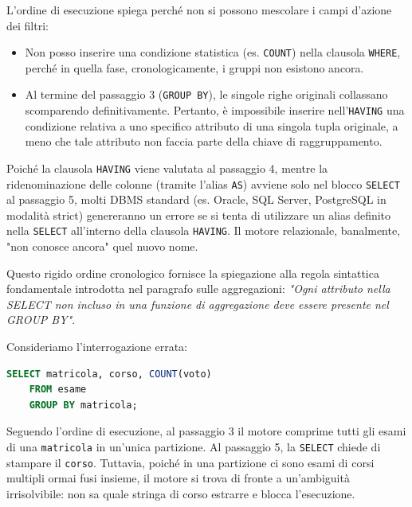 \begin{warningbox}
L'ordine di esecuzione spiega perché non si possono mescolare i campi d'azione dei filtri:
\begin{itemize}
    \item Non posso inserire una condizione statistica (es. \texttt{COUNT}) nella clausola \texttt{WHERE}, perché in quella fase, cronologicamente, i gruppi non esistono ancora.
    \item Al termine del passaggio 3 (\texttt{GROUP BY}), le singole righe originali collassano scomparendo definitivamente. Pertanto, è impossibile inserire nell'\texttt{HAVING} una condizione relativa a uno specifico attributo di una singola tupla originale, a meno che tale attributo non faccia parte della chiave di raggruppamento.
\end{itemize}
\end{warningbox}

\begin{observation}
Poiché la clausola \texttt{HAVING} viene valutata al passaggio 4, mentre la ridenominazione delle colonne (tramite l'alias \texttt{AS}) avviene solo nel blocco \texttt{SELECT} al passaggio 5, molti DBMS standard (es. Oracle, SQL Server, PostgreSQL in modalità strict) genereranno un errore se si tenta di utilizzare un alias definito nella \texttt{SELECT} all'interno della clausola \texttt{HAVING}. Il motore relazionale, banalmente, "non conosce ancora" quel nuovo nome.
\end{observation}

\begin{dettagli}
    Questo rigido ordine cronologico fornisce la spiegazione alla regola sintattica fondamentale introdotta nel paragrafo sulle aggregazioni: \textit{"Ogni attributo nella SELECT non incluso in una funzione di aggregazione deve essere presente nel GROUP BY"}.

    \begin{example}
    Consideriamo l'interrogazione errata:
    \begin{lstlisting}[language=SQL, basicstyle=\ttfamily\small, keywordstyle=\color{blue}\bfseries]
    SELECT matricola, corso, COUNT(voto)
    FROM esame
    GROUP BY matricola;
    \end{lstlisting}
    Seguendo l'ordine di esecuzione, al passaggio 3 il motore comprime tutti gli esami di una \texttt{matricola} in un'unica partizione. Al passaggio 5, la \texttt{SELECT} chiede di stampare il \texttt{corso}. Tuttavia, poiché in una partizione ci sono esami di corsi multipli ormai fusi insieme, il motore si trova di fronte a un'ambiguità irrisolvibile: non sa quale stringa di corso estrarre e blocca l'esecuzione.
    \end{example}

\end{dettagli}

